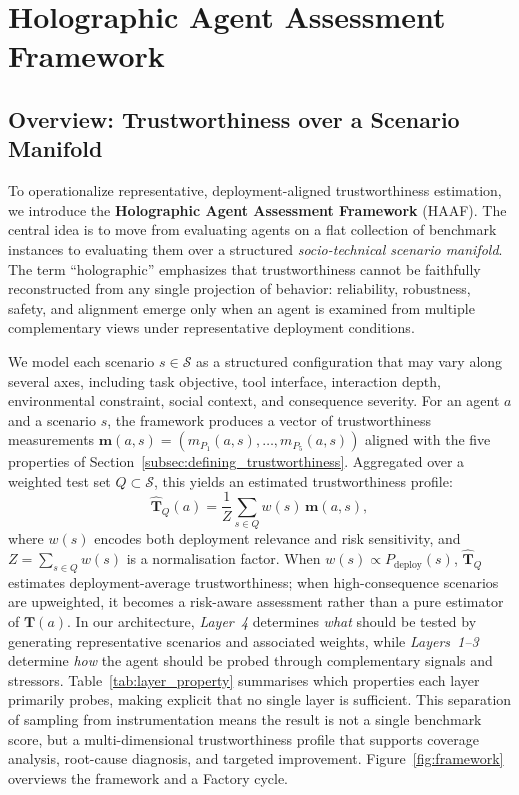

\section{Holographic Agent Assessment Framework}
\label{sec:framework}

\subsection{Overview: Trustworthiness over a Scenario Manifold}
\label{subsec:overview}

To operationalize representative, deployment-aligned trustworthiness estimation, we introduce the \textbf{Holographic Agent Assessment Framework} (HAAF). The central idea is to move from evaluating agents on a flat collection of benchmark instances to evaluating them over a structured \emph{socio-technical scenario manifold}. The term ``holographic'' emphasizes that trustworthiness cannot be faithfully reconstructed from any single projection of behavior: reliability, robustness, safety, and alignment emerge only when an agent is examined from multiple complementary views under representative deployment conditions.

We model each scenario $s \in \mathcal{S}$ as a structured configuration that may vary along several axes, including task objective, tool interface, interaction depth, environmental constraint, social context, and consequence severity. For an agent $a$ and a scenario $s$, the framework produces a vector of trustworthiness measurements $\mathbf{m}(a,s) = (m_{P_1}(a,s), \dots, m_{P_5}(a,s))$ aligned with the five properties of Section~\ref{subsec:defining_trustworthiness}. Aggregated over a weighted test set $Q \subset \mathcal{S}$, this yields an estimated trustworthiness profile:
\[
\hat{\mathbf{T}}_{Q}(a) = \frac{1}{Z}\sum_{s \in Q} w(s)\,\mathbf{m}(a,s),
\]
where $w(s)$ encodes both deployment relevance and risk sensitivity, and $Z=\sum_{s \in Q} w(s)$ is a normalisation factor. When $w(s) \propto P_{\mathrm{deploy}}(s)$, $\hat{\mathbf{T}}_{Q}$ estimates deployment-average trustworthiness; when high-consequence scenarios are upweighted, it becomes a risk-aware assessment rather than a pure estimator of $\mathbf{T}(a)$. In our architecture, \emph{Layer~4} determines \emph{what} should be tested by generating representative scenarios and associated weights, while \emph{Layers~1--3} determine \emph{how} the agent should be probed through complementary signals and stressors. Table~\ref{tab:layer_property} summarises which properties each layer primarily probes, making explicit that no single layer is sufficient. This separation of sampling from instrumentation means the result is not a single benchmark score, but a multi-dimensional trustworthiness profile that supports coverage analysis, root-cause diagnosis, and targeted improvement. Figure~\ref{fig:framework} overviews the framework and a Factory cycle.

